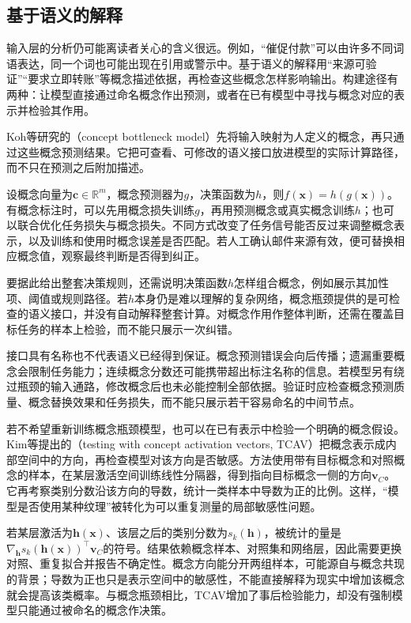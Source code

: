 \subsection{基于语义的解释}
\label{sec:interpretability-global-concepts}

输入层的分析仍可能离读者关心的含义很远。例如，“催促付款”可以由许多不同词语表达，同一个词也可能出现在引用或警示中。基于语义的解释用“来源可验证”“要求立即转账”等概念描述依据，再检查这些概念怎样影响输出。构建途径有两种：让模型直接通过命名概念作出预测，或者在已有模型中寻找与概念对应的表示并检验其作用。

Koh等研究的（concept bottleneck model）先将输入映射为人定义的概念，再只通过这些概念预测结果。它把可查看、可修改的语义接口放进模型的实际计算路径，而不只在预测之后附加描述。

设概念向量为$\bm{c}\in\mathbb R^m$，概念预测器为$g$，决策函数为$h$，则$f(\bm{x})=h(g(\bm{x}))$。有概念标注时，可以先用概念损失训练$g$，再用预测概念或真实概念训练$h$；也可以联合优化任务损失与概念损失。不同方式改变了任务信号能否反过来调整概念表示，以及训练和使用时概念误差是否匹配。若人工确认邮件来源有效，便可替换相应概念值，观察最终判断是否得到纠正。

要据此给出整套决策规则，还需说明决策函数$h$怎样组合概念，例如展示其加性项、阈值或规则路径。若$h$本身仍是难以理解的复杂网络，概念瓶颈提供的是可检查的语义接口，并没有自动解释整套计算。对概念作用作整体判断，还需在覆盖目标任务的样本上检验，而不能只展示一次纠错。

接口具有名称也不代表语义已经得到保证。概念预测错误会向后传播；遗漏重要概念会限制任务能力；连续概念分数还可能携带超出标注名称的信息。若模型另有绕过瓶颈的输入通路，修改概念后也未必能控制全部依据。验证时应检查概念预测质量、概念替换效果和任务损失，而不能只展示若干容易命名的中间节点。

若不希望重新训练概念瓶颈模型，也可以在已有表示中检验一个明确的概念假设。Kim等提出的（testing with concept activation vectors, TCAV）把概念表示成内部空间中的方向，再检查模型对该方向是否敏感。方法使用带有目标概念和对照概念的样本，在某层激活空间训练线性分隔器，得到指向目标概念一侧的方向$\bm{v}_C$。它再考察类别分数沿该方向的导数，统计一类样本中导数为正的比例。这样，“模型是否使用某种纹理”被转化为可以重复测量的局部敏感性问题。

若某层激活为$\bm{h}(\bm{x})$、该层之后的类别分数为$s_k(\bm{h})$，被统计的量是$\nabla_{\bm h}s_k(\bm{h}(\bm{x}))^\top\bm{v}_C$的符号。结果依赖概念样本、对照集和网络层，因此需要更换对照、重复拟合并报告不确定性。概念方向能分开两组样本，可能源自与概念共现的背景；导数为正也只是表示空间中的敏感性，不能直接解释为现实中增加该概念就会提高该类概率。与概念瓶颈相比，TCAV增加了事后检验能力，却没有强制模型只能通过被命名的概念作决策。

